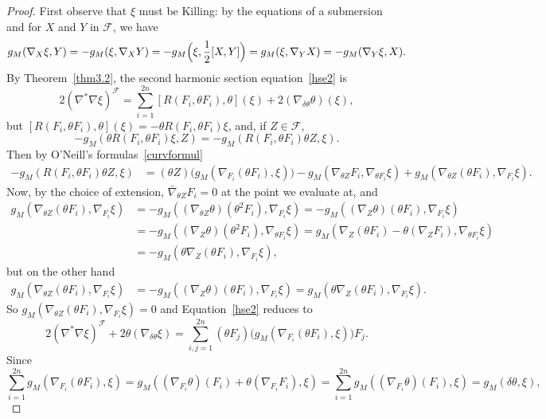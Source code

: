 \documentclass[a4paper,reqno]{amsart}
\theoremstyle{definition}
\theoremstyle{remark}
\theoremstyle{plain}
\numberwithin{equation}{section}
\newcommand{\f}{\mathcal{F}}
\begin{document}
\begin{proof}
First observe that $\xi$ must be Killing: by the equations of a
submersion~\cite{ONeill} and for $X$ and $Y$ in $\f$, we have
\begin{align*}
  g_M(\nabla_X \xi, Y)=-g_M(\xi, \nabla_X Y)=-
  g_M\Bigl(\xi, \frac{1}{2}[X, Y]\Bigr)=g_M(\xi,
  \nabla_Y X)=- g_M(\nabla_Y \xi, X). 
\end{align*}
By Theorem~\ref{thm3.2}, the second harmonic section equation~\eqref{hse2} is
$$
2(\nabla^{*}\nabla \xi )^{\f}= \sum_{i=1}^{2n}[R(F_i,\theta
F_i),\theta ] (\xi)+ 2(\nabla_{\delta \theta} \theta) (\xi),
$$
but 
$[R(F_i,\theta  F_i),\theta ] (\xi) = -\theta R(F_i,\theta  F_i)\xi$,
and, if $Z\in \f$,
$$-g_M(\theta R(F_i,\theta  F_i)\xi , Z) = -g_M(R(F_i,\theta
F_i)\theta Z , \xi).
$$
Then by O'Neill's formulas~\eqref{curvformul} 
\begin{align*}
-g_M(R(F_i,\theta  F_i)\theta Z , \xi) 
&= (\theta Z)\big( g_M(\nabla_{F_i} (\theta F_i ),\xi)\big) - g_M(\nabla_{\theta Z}F_i  , \nabla_{\theta F_i} \xi) + 
g_M(\nabla_{\theta Z}(\theta F_i) , \nabla_{F_i}\xi).
\end{align*}
Now, by the choice of extension, $\bar{\nabla}_{\theta Z}F_i =0$
at the point we evaluate at, and
\begin{align*}
g_M(\nabla_{\theta Z}(\theta F_i) , \nabla_{F_i}\xi)
  &=-g_M((\nabla_{\theta Z}\theta) (\theta^2 F_i),\nabla_{F_i}\xi)
    = - g_M((\nabla_{Z}\theta) (\theta F_i) , \nabla_{F_i}\xi) \\ &
= - g_M((\nabla_{Z}\theta) (\theta^2 F_i) , \nabla_{\theta F_i}\xi) = g_M(\nabla_{Z}(\theta F_i) - \theta(\nabla_{Z}F_i), \nabla_{\theta F_i}\xi) \\
&= - g_M(\theta \nabla_{Z}(\theta F_i) , \nabla_{F_i}\xi)  ,
\end{align*}
but on the other hand
\begin{align*}
g_M(\nabla_{\theta Z}(\theta F_i) , \nabla_{F_i}\xi) &= - g_M((\nabla_{Z}\theta) (\theta F_i) , \nabla_{F_i}\xi) 
= g_M(\theta \nabla_{Z} (\theta F_i), \nabla_{F_i}\xi).
\end{align*}
So $g_M(\nabla_{\theta Z}(\theta F_i) , \nabla_{F_i}\xi) =0$ and
Equation~\eqref{hse2} reduces to 
$$
2(\nabla^{*}\nabla \xi )^{\f} +2 \theta(\nabla_{\delta \theta} \xi)
=\sum_{i,j=1}^{2n}(\theta F_j)\big(g_M(\nabla_{F_i} (\theta F_i
),\xi)\big) F_j.
$$
Since
\begin{equation*}
  \sum_{i=1}^{2n} g_M(\nabla_{F_i} (\theta F_i ),\xi) =  g_M((\nabla_{F_i} \theta)( F_i ) + \theta(\nabla_{F_i} F_i),\xi) 
 = \sum_{i=1}^{2n} g_M((\nabla_{F_i} \theta)( F_i ) ,\xi) =  g_M(\delta \theta ,\xi), 

\end{equation*}
\end{proof}
\end{document}
